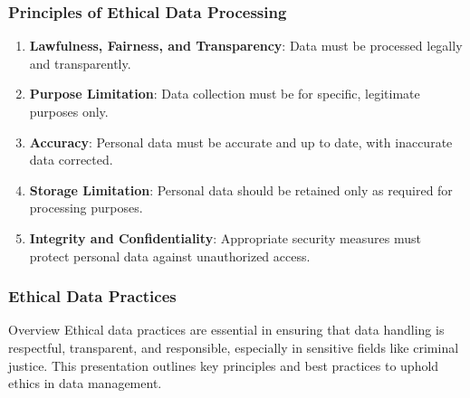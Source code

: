 \documentclass[aspectratio=169]{beamer}
\begin{document}
\begin{frame}[fragile]
  \frametitle{Principles of Ethical Data Processing}
  \begin{enumerate}
    \item \textbf{Lawfulness, Fairness, and Transparency}: Data must be processed legally and transparently.
    \item \textbf{Purpose Limitation}: Data collection must be for specific, legitimate purposes only.
    \item \textbf{Accuracy}: Personal data must be accurate and up to date, with inaccurate data corrected.
    \item \textbf{Storage Limitation}: Personal data should be retained only as required for processing purposes.
    \item \textbf{Integrity and Confidentiality}: Appropriate security measures must protect personal data against unauthorized access.
  \end{enumerate}
\end{frame}

\begin{frame}[fragile]
    \frametitle{Ethical Data Practices}
    \begin{block}{Overview}
        Ethical data practices are essential in ensuring that data handling is respectful, transparent, and responsible, especially in sensitive fields like criminal justice. This presentation outlines key principles and best practices to uphold ethics in data management.
    \end{block}
\end{frame}
\end{document}
